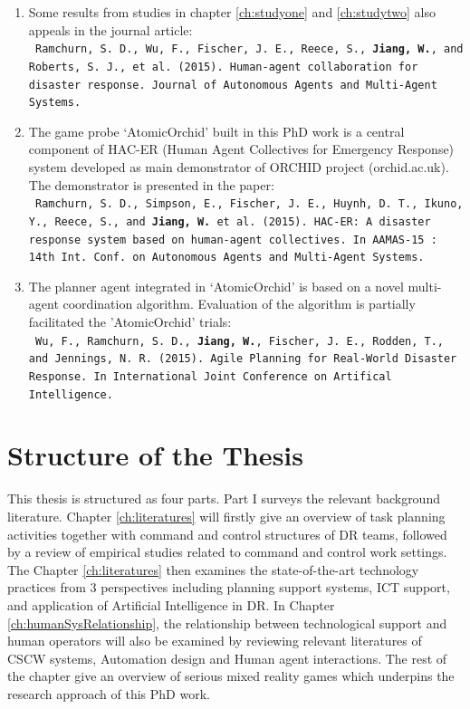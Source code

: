 \begin{enumerate}
\item Some results from studies in chapter \ref{ch:studyone} and \ref{ch:studytwo} also appeals in the journal article:\\
\texttt{ \footnotesize Ramchurn, S. D., Wu, F., Fischer, J. E., Reece, S., \textbf{Jiang, W.}, and Roberts, S. J., et al. (2015). Human-agent collaboration for disaster response. Journal of Autonomous Agents and Multi-Agent Systems.}\\

\item The game probe `AtomicOrchid' built in this PhD work is a central component of HAC-ER (Human Agent Collectives for Emergency Response) system  developed as main demonstrator of ORCHID project (orchid.ac.uk). The demonstrator is presented in the paper:\\
\texttt{ \footnotesize Ramchurn, S. D., Simpson, E., Fischer, J. E., Huynh, D. T., Ikuno, Y., Reece, S., and \textbf{ Jiang, W.} et al. (2015). HAC-ER: A disaster response system based on human-agent collectives. In AAMAS-15 : 14th Int. Conf. on Autonomous Agents and Multi-Agent Systems.} \\ 

\item The planner agent integrated in `AtomicOrchid' is based on a novel multi-agent coordination algorithm. Evaluation of the algorithm is partially facilitated the 'AtomicOrchid' trials:\\
 \texttt{ \footnotesize Wu, F., Ramchurn, S. D., \textbf{Jiang, W.}, Fischer, J. E., Rodden, T., and Jennings, N. R. (2015). Agile Planning for Real-World Disaster Response. In International Joint Conference on Artifical Intelligence.}

\end{enumerate} 

\section{Structure of the Thesis}
This thesis is structured as four parts. Part I surveys the relevant background literature. Chapter \ref{ch:literatures} will firstly give an overview of task planning activities together with command and control structures of \ac{DR} teams, followed by a review of empirical studies related to command and control work settings. The Chapter \ref{ch:literatures} then examines the state-of-the-art technology practices from 3 perspectives including planning support systems, \ac{ICT} support, and application of Artificial Intelligence in \ac{DR}. In Chapter \ref{ch:humanSysRelationship}, the relationship between technological support and human operators will also be examined by reviewing relevant literatures of \ac{CSCW} systems, Automation design and Human agent interactions. The rest of the chapter give an overview of serious mixed reality games which underpins the research approach of this PhD work.\\

